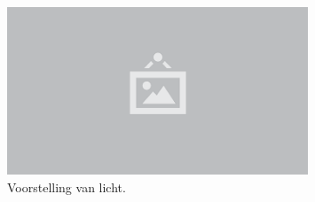 \begin{figure}
  \centering
  \includegraphics[width=0.8\textwidth]{./img/raw/placeholder.png}
  \caption{Voorstelling van licht.}
  \label{fig:pl-licht}
\end{figure}
